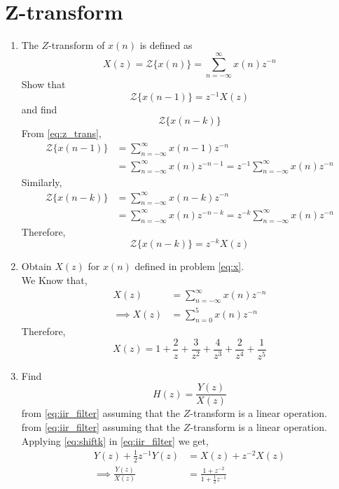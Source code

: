 \documentclass[journal,12pt,twocolumn]{IEEEtran}
\renewcommand\thesection{\arabic{section}}
\begin{document}
\section{Z-transform}
\begin{enumerate}[label=\thesection.\arabic*
,ref=\thesection.\theenumi]

\item The $Z$-transform of $x(n)$ is defined as
%
\begin{equation}
\label{eq:z_trans}
X(z)={\mathcal {Z}}\{x(n)\}=\sum _{n=-\infty }^{\infty }x(n)z^{-n}
\end{equation}
%
Show that
\begin{equation}
\label{eq:shift1}
{\mathcal {Z}}\{x(n-1)\} = z^{-1}X(z)
\end{equation}
and find
\begin{equation}
	{\mathcal {Z}}\{x(n-k)\} 
\end{equation}
\solution From \eqref{eq:z_trans},
\begin{align}
{\mathcal {Z}}\{x(n-1)\} &=\sum _{n=-\infty }^{\infty }x(n-1)z^{-n}
\\
&=\sum _{n=-\infty }^{\infty }x(n)z^{-n-1} = z^{-1}\sum _{n=-\infty }^{\infty }x(n)z^{-n}
\end{align}
Similarly,
\begin{align}
{\mathcal {Z}}\{x(n-k)\} &=\sum _{n=-\infty }^{\infty }x(n-k)z^{-n}
\\
&=\sum _{n=-\infty }^{\infty }x(n)z^{-n-k} = z^{-k}\sum _{n=-\infty }^{\infty }x(n)z^{-n}
\end{align}
Therefore,
\begin{equation}
\label{eq:shiftk}
{\mathcal {Z}}\{x(n-k)\} = z^{-k}X(z)
\end{equation}


\item Obtain $X(z)$ for $x(n)$ defined in problem 
	\ref{eq:x}.
\\
\solution We Know that,
\begin{align}
X(z)&=\sum _{n=-\infty }^{\infty }x(n)z^{-n}
\\
\implies X(z)&= \sum _{n=0}^{5}x(n)z^{-n}
\end{align}
Therefore,
\begin{equation}
    X(z)= 1 + \frac{2}{z} + \frac{3}{z^{2}} + \frac{4}{z^{3}} + \frac{2}{z^{4}} + \frac{1}{z^{5}} 
\end{equation}


\item Find
%
\begin{equation}
H(z) = \frac{Y(z)}{X(z)}
\end{equation}
%
from  \eqref{eq:iir_filter} assuming that the $Z$-transform is a linear operation.
\\
\solution from  \eqref{eq:iir_filter} assuming that the $Z$-transform is a linear operation.
\\
Applying \eqref{eq:shiftk} in \eqref{eq:iir_filter} we get,
\begin{align}
Y(z) + \frac{1}{2}z^{-1}Y(z) &= X(z)+z^{-2}X(z)
\\
\implies \frac{Y(z)}{X(z)} &= \frac{1 + z^{-2}}{1 + \frac{1}{2}z^{-1}}
\label{eq:freq_resp}
\end{align}



\end{enumerate}
\end{document}
